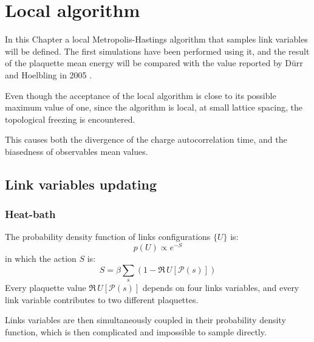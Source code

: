 \chapter{Local algorithm}\label{ch:local}

In this Chapter a local Metropolis-Hastings algorithm that samples link variables will be defined.
The first simulations have been performed using it,
and the result of the plaquette mean energy will be compared with the value reported by D\"urr and Hoelbling in 2005 \cite{durr-hoelbling:2005}.

Even though the acceptance of the local algorithm is close to its possible maximum value of one,
since the algorithm is local, at small lattice spacing, the topological freezing is encountered.

This causes both the divergence of the charge autocorrelation time,
and the biasedness of observables mean values.

\section{Link variables updating}
\subsection*{Heat-bath}
The probability density function of links configurations $\{U\}$ is:
\[
    p(U) \propto e^{-S}
\]
in which the action $S$ is:
\[
    S = \beta\sum_s\left(1-\Re\,U[\mathcal P(s)]\right)
\]
Every plaquette value $\Re\,U[\mathcal P(s)]$ depends on four links variables,
and every link variable contributes to two different plaquettes.

Links variables are then simultaneously coupled in their probability density function,
which is then complicated and impossible to sample directly.

